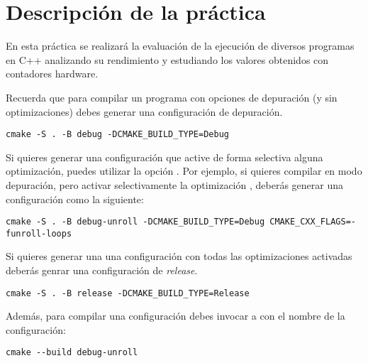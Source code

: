 \section{Descripción de la práctica}

En esta práctica se realizará la evaluación de la ejecución de diversos
programas en C++ analizando su rendimiento y estudiando los valores
obtenidos con contadores hardware.

Recuerda que para compilar un programa con opciones de depuración
(y sin optimizaciones) debes generar una configuración de depuración.

\begin{lstlisting}[style=terminal,aboveskip=1em,belowskip=1em]
cmake -S . -B debug -DCMAKE_BUILD_TYPE=Debug
\end{lstlisting}

Si quieres generar una configuración que active de forma selectiva alguna optimización,
puedes utilizar la opción . Por ejemplo,
si quieres compilar en modo depuración, pero activar selectivamente
la optimización , deberás generar una configuración
como la siguiente:

\begin{lstlisting}[style=terminal,aboveskip=1em,belowskip=1em]
cmake -S . -B debug-unroll -DCMAKE_BUILD_TYPE=Debug CMAKE_CXX_FLAGS=-funroll-loops
\end{lstlisting}

Si quieres generar una una configuración con todas las optimizaciones
activadas deberás genrar una configuración de \emph{release}.

\begin{lstlisting}[style=terminal,aboveskip=1em,belowskip=1em]
cmake -S . -B release -DCMAKE_BUILD_TYPE=Release
\end{lstlisting}

Además, para compilar una configuración debes invocar a 
con el nombre de la configuración:

\begin{lstlisting}[style=terminal,aboveskip=1em,belowskip=1em]
cmake --build debug-unroll
\end{lstlisting}

